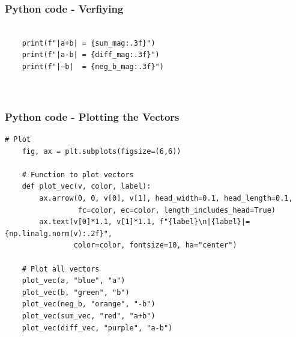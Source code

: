 \documentclass{beamer}
\begin{document}
\begin{frame}[fragile]                            
\frametitle{Python code - Verfiying}                
\begin{lstlisting}
 
    print(f"|a+b| = {sum_mag:.3f}")
    print(f"|a-b| = {diff_mag:.3f}")
    print(f"|−b|  = {neg_b_mag:.3f}")

   

\end{lstlisting}
\end{frame}

\begin{frame}[fragile]                            
\frametitle{Python code - Plotting the Vectors}                
\begin{lstlisting}
# Plot
    fig, ax = plt.subplots(figsize=(6,6))
    
    # Function to plot vectors
    def plot_vec(v, color, label):
        ax.arrow(0, 0, v[0], v[1], head_width=0.1, head_length=0.1,
                 fc=color, ec=color, length_includes_head=True)
        ax.text(v[0]*1.1, v[1]*1.1, f"{label}\n|{label}|={np.linalg.norm(v):.2f}", 
                color=color, fontsize=10, ha="center")
    
    # Plot all vectors
    plot_vec(a, "blue", "a")
    plot_vec(b, "green", "b")
    plot_vec(neg_b, "orange", "-b")
    plot_vec(sum_vec, "red", "a+b")
    plot_vec(diff_vec, "purple", "a-b")
   \end{lstlisting}
\end{frame}
\end{document}
